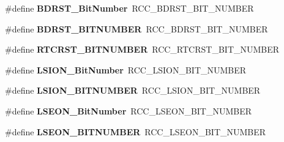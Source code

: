 \begin{DoxyCompactItemize}
\item 
\#define {\bfseries B\+D\+R\+S\+T\+\_\+\+Bit\+Number}~R\+C\+C\+\_\+\+B\+D\+R\+S\+T\+\_\+\+B\+I\+T\+\_\+\+N\+U\+M\+B\+ER\hypertarget{group___h_a_l___r_c_c___aliased_gae6718158034388d8fde8caaa28ffe8b9}{}\label{group___h_a_l___r_c_c___aliased_gae6718158034388d8fde8caaa28ffe8b9}

\item 
\#define {\bfseries B\+D\+R\+S\+T\+\_\+\+B\+I\+T\+N\+U\+M\+B\+ER}~R\+C\+C\+\_\+\+B\+D\+R\+S\+T\+\_\+\+B\+I\+T\+\_\+\+N\+U\+M\+B\+ER\hypertarget{group___h_a_l___r_c_c___aliased_ga8a86677bfcc1259edf9b9a5f85e7e04a}{}\label{group___h_a_l___r_c_c___aliased_ga8a86677bfcc1259edf9b9a5f85e7e04a}

\item 
\#define {\bfseries R\+T\+C\+R\+S\+T\+\_\+\+B\+I\+T\+N\+U\+M\+B\+ER}~R\+C\+C\+\_\+\+R\+T\+C\+R\+S\+T\+\_\+\+B\+I\+T\+\_\+\+N\+U\+M\+B\+ER\hypertarget{group___h_a_l___r_c_c___aliased_ga0cfaa60ebd031d12bff625ca896f1fd5}{}\label{group___h_a_l___r_c_c___aliased_ga0cfaa60ebd031d12bff625ca896f1fd5}

\item 
\#define {\bfseries L\+S\+I\+O\+N\+\_\+\+Bit\+Number}~R\+C\+C\+\_\+\+L\+S\+I\+O\+N\+\_\+\+B\+I\+T\+\_\+\+N\+U\+M\+B\+ER\hypertarget{group___h_a_l___r_c_c___aliased_ga3f9dbe50769ce2a63ae12520433b9b40}{}\label{group___h_a_l___r_c_c___aliased_ga3f9dbe50769ce2a63ae12520433b9b40}

\item 
\#define {\bfseries L\+S\+I\+O\+N\+\_\+\+B\+I\+T\+N\+U\+M\+B\+ER}~R\+C\+C\+\_\+\+L\+S\+I\+O\+N\+\_\+\+B\+I\+T\+\_\+\+N\+U\+M\+B\+ER\hypertarget{group___h_a_l___r_c_c___aliased_ga240275048c246bf22b5fce8ff4f7b33d}{}\label{group___h_a_l___r_c_c___aliased_ga240275048c246bf22b5fce8ff4f7b33d}

\item 
\#define {\bfseries L\+S\+E\+O\+N\+\_\+\+Bit\+Number}~R\+C\+C\+\_\+\+L\+S\+E\+O\+N\+\_\+\+B\+I\+T\+\_\+\+N\+U\+M\+B\+ER\hypertarget{group___h_a_l___r_c_c___aliased_ga9d9171281f96c7cd004520985e3ae27f}{}\label{group___h_a_l___r_c_c___aliased_ga9d9171281f96c7cd004520985e3ae27f}

\item 
\#define {\bfseries L\+S\+E\+O\+N\+\_\+\+B\+I\+T\+N\+U\+M\+B\+ER}~R\+C\+C\+\_\+\+L\+S\+E\+O\+N\+\_\+\+B\+I\+T\+\_\+\+N\+U\+M\+B\+ER\hypertarget{group___h_a_l___r_c_c___aliased_ga9dcf3f6a2fd518a7fd96f96280f81f8f}{}\label{group___h_a_l___r_c_c___aliased_ga9dcf3f6a2fd518a7fd96f96280f81f8f}


\end{DoxyCompactItemize}
